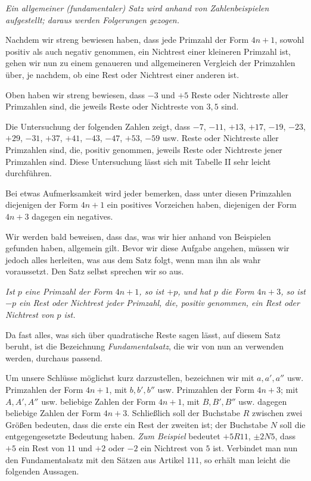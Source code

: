 \begin{center}\textit{Ein allgemeiner (fundamentaler) Satz wird anhand von Zahlenbeispielen aufgestellt; daraus werden Folgerungen gezogen.}\end{center}

Nachdem wir streng bewiesen haben, dass jede Primzahl der Form $4n+1$, sowohl positiv als auch negativ genommen, ein Nichtrest einer kleineren Primzahl ist, gehen wir nun zu einem genaueren und allgemeineren Vergleich der Primzahlen über, je nachdem, ob eine Rest oder Nichtrest einer anderen ist.

Oben haben wir streng bewiesen, dass $-3$ und $+5$ Reste oder Nichtreste aller Primzahlen sind, die jeweils Reste oder Nichtreste von $3, 5$ sind.

Die Untersuchung der folgenden Zahlen zeigt, dass $-7$, $-11$, $+13$, $+17$, $-19$, $-23$, $+29$, $-31$, $+37$, $+41$, $-43$, $-47$, $+53$, $-59$ usw. Reste oder Nichtreste aller Primzahlen sind, die, positiv genommen, jeweils Reste oder Nichtreste jener Primzahlen sind. Diese Untersuchung lässt sich mit Tabelle II sehr leicht durchführen.

Bei etwas Aufmerksamkeit wird jeder bemerken, dass unter diesen Primzahlen diejenigen der Form $4n+1$ ein positives Vorzeichen haben, diejenigen der Form $4n+3$ dagegen ein negatives.

Wir werden bald beweisen, dass das, was wir hier anhand von Beispielen gefunden haben, allgemein gilt. Bevor wir diese Aufgabe angehen, müssen wir jedoch alles herleiten, was aus dem Satz folgt, wenn man ihn als wahr voraussetzt. Den Satz selbst sprechen wir so aus.

\emph{Ist $p$ eine Primzahl der Form $4n+1$, so ist $+p$, und hat $p$ die Form $4n+3$, so ist $-p$ ein Rest oder Nichtrest jeder Primzahl, die, positiv genommen, ein Rest oder Nichtrest von $p$ ist.}

Da fast alles, was sich über quadratische Reste sagen lässt, auf diesem Satz beruht, ist die Bezeichnung \emph{Fundamentalsatz}, die wir von nun an verwenden werden, durchaus passend.

Um unsere Schlüsse möglichst kurz darzustellen, bezeichnen wir mit $a, a', a''$ usw. Primzahlen der Form $4n+1$, mit $b, b', b''$ usw. Primzahlen der Form $4n+3$; mit $A, A', A''$ usw. beliebige Zahlen der Form $4n+1$, mit $B, B', B''$ usw. dagegen beliebige Zahlen der Form $4n+3$. Schließlich soll der Buchstabe $R$ zwischen zwei Größen bedeuten, dass die erste ein Rest der zweiten ist; der Buchstabe $N$ soll die entgegengesetzte Bedeutung haben. \emph{Zum Beispiel} bedeutet $+5R11$, $\pm 2N5$, dass $+5$ ein Rest von $11$ und $+2$ oder $-2$ ein Nichtrest von $5$ ist. Verbindet man nun den Fundamentalsatz mit den Sätzen aus Artikel $111$, so erhält man leicht die folgenden Aussagen.

